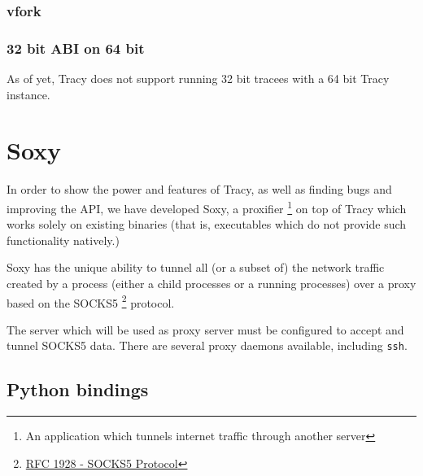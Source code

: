 \documentclass[a4paper, 10pt]{report}
\begin{document}


\subsection{vfork}


\subsection{32 bit ABI on 64 bit}

As of yet, Tracy does not support running 32 bit tracees with a 64 bit
Tracy instance.




\chapter{Soxy}
\label{chapter:soxy}

In order to show the power and features of Tracy, as well as finding bugs and
improving the API, we have developed Soxy, a proxifier \footnote{An
application which tunnels internet traffic through another server} on top of
Tracy which works solely on existing binaries (that is, executables which do
not provide such functionality natively.)

Soxy has the unique ability to tunnel all (or a subset of) the network traffic
created by a process (either a child processes or a running processes) over a
proxy based on the SOCKS5 \footnote{\href{http://www.ietf.org/rfc/rfc1928.txt}
{RFC 1928 - SOCKS5 Protocol}} protocol.

The server which will be used as proxy server must be configured to accept and
tunnel SOCKS5 data. There are several proxy daemons available, including
\verb=ssh=.

\section{Python bindings}

\end{document}

